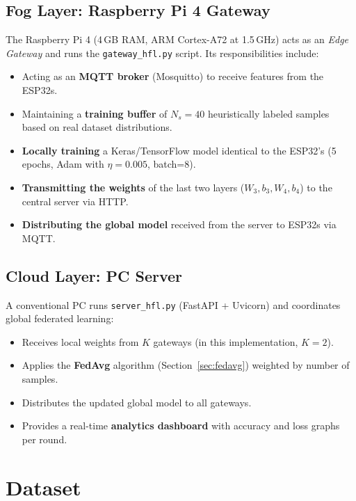 \subsection{Fog Layer: Raspberry Pi 4 Gateway}

The Raspberry Pi 4 (4\,GB RAM, ARM Cortex-A72 at 1.5\,GHz) acts as an \emph{Edge Gateway} and runs the \texttt{gateway\_hfl.py} script. Its responsibilities include:
\begin{itemize}
    \item Acting as an \textbf{MQTT broker} (Mosquitto) to receive features from the ESP32s.
    \item Maintaining a \textbf{training buffer} of $N_s = 40$ heuristically labeled samples based on real dataset distributions.
    \item \textbf{Locally training} a Keras/TensorFlow model identical to the ESP32's (5 epochs, Adam with $\eta=0.005$, batch=8).
    \item \textbf{Transmitting the weights} of the last two layers ($W_3, b_3, W_4, b_4$) to the central server via HTTP.
    \item \textbf{Distributing the global model} received from the server to ESP32s via MQTT.
\end{itemize}

\subsection{Cloud Layer: PC Server}

A conventional PC runs \texttt{server\_hfl.py} (FastAPI + Uvicorn) and coordinates global federated learning:
\begin{itemize}
    \item Receives local weights from $K$ gateways (in this implementation, $K=2$).
    \item Applies the \textbf{FedAvg} algorithm (Section~\ref{sec:fedavg}) weighted by number of samples.
    \item Distributes the updated global model to all gateways.
    \item Provides a real-time \textbf{analytics dashboard} with accuracy and loss graphs per round.
\end{itemize}

\section{Dataset}
\label{sec:dataset}

